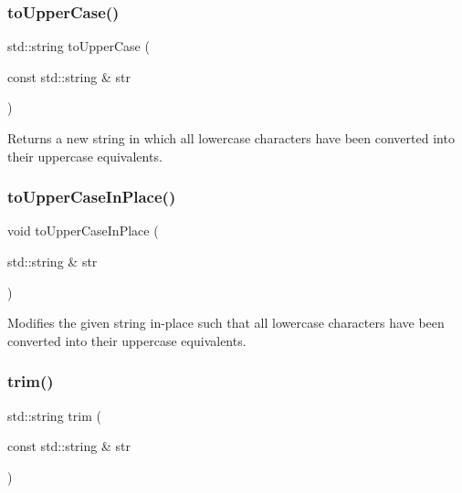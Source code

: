 \subsubsection{\texorpdfstring{to\+Upper\+Case()}{toUpperCase()}\hspace{0.1cm}{\footnotesize\ttfamily [2/2]}}
{\footnotesize\ttfamily std\+::string to\+Upper\+Case (\begin{DoxyParamCaption}\item[{const std\+::string \&}]{str }\end{DoxyParamCaption})}



Returns a new string in which all lowercase characters have been converted into their uppercase equivalents. 

\mbox{\label{namespacesgl_1_1priv_1_1strlib_a5501f6f1a57507fd37a02c8eec4c26c6}} 
\subsubsection{\texorpdfstring{to\+Upper\+Case\+In\+Place()}{toUpperCaseInPlace()}}
{\footnotesize\ttfamily void to\+Upper\+Case\+In\+Place (\begin{DoxyParamCaption}\item[{std\+::string \&}]{str }\end{DoxyParamCaption})}



Modifies the given string in-\/place such that all lowercase characters have been converted into their uppercase equivalents. 

\mbox{\label{namespacesgl_1_1priv_1_1strlib_a5a01f705cc7b4a7317a57f6bf41aef25}} 
\subsubsection{\texorpdfstring{trim()}{trim()}}
{\footnotesize\ttfamily std\+::string trim (\begin{DoxyParamCaption}\item[{const std\+::string \&}]{str }\end{DoxyParamCaption})}



